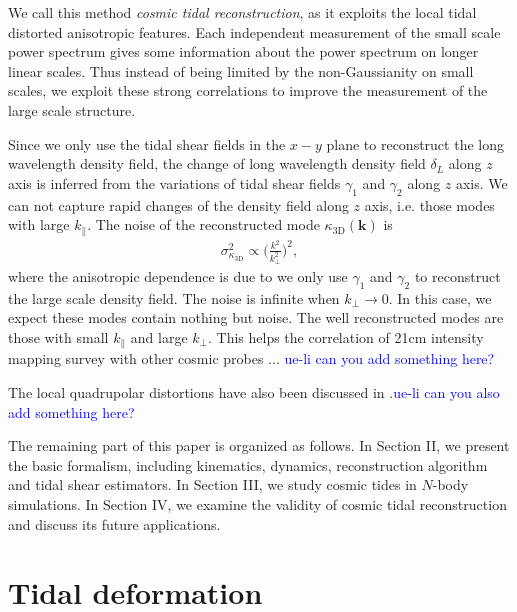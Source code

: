\documentclass[aps,prd,twocolumn,showpacs,superscriptaddress,groupedaddress,nofootinbib]{revtex4}  %
\newcommand{\mr}{\mathrm}
\begin{document}
We call this method {\it cosmic tidal reconstruction}, as it exploits the
local tidal distorted anisotropic features.
Each independent measurement of the small scale power spectrum gives some 
information about the power spectrum on longer linear scales. 
Thus instead of being limited by the non-Gaussianity on small scales, we exploit these strong correlations to
improve the measurement of the large scale structure. 

Since we only use the tidal shear fields in the $x-y$ plane to reconstruct
the long wavelength density field, the change of long wavelength density
field $\delta_L$ along $z$ axis is inferred from the variations of tidal shear
fields $\gamma_1$ and $\gamma_2$ along $z$ axis.
We can not capture rapid changes of the density field along $z$ axis, 
i.e. those modes with large $k_\parallel$.
The noise of the reconstructed mode $\kappa_\mr{3D}(\bm{k})$ is 
\begin{eqnarray}
\sigma^2_{\kappa_\mr{3D}}\propto\bigg(\frac{k^2}{k_\perp^2}\bigg)^2,
\end{eqnarray}
where the anisotropic dependence is due to we only use $\gamma_{1}$ and 
$\gamma_2$ to reconstruct the large scale density field. 
The noise is infinite when $k_\perp\to0$. 
In this case, we expect these modes contain nothing but noise. 
The well reconstructed modes are those with small $k_\parallel$ and large
$k_\perp$. This helps the correlation of 21cm intensity mapping survey with
other cosmic probes ... \textcolor{blue}{ue-li can you add something here?}

The local quadrupolar distortions have also been discussed in \cite{2012:jeong}.\textcolor{blue}{ue-li can you also add something here?}

The remaining part of this paper is organized as follows.
In Section II, we present the basic formalism, including kinematics, 
dynamics, reconstruction algorithm and tidal shear estimators. In Section III,
we study cosmic tides in $N$-body simulations. In Section IV,
we examine the validity of cosmic tidal reconstruction and discuss its 
future applications.

\section{Tidal deformation}
\end{document}

